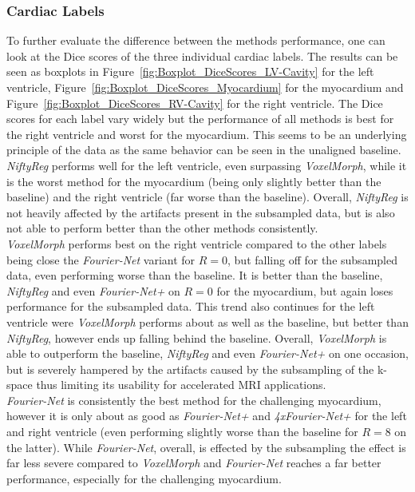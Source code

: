 \documentclass[english,version-2022-01]{uzl-thesis} %
\begin{document}
\subsubsection{Cardiac Labels}
To further evaluate the difference between the methods performance, one can look at the Dice scores of the three individual cardiac labels. The results can be seen as boxplots in Figure~\ref{fig:Boxplot_DiceScores_LV-Cavity} for the left ventricle, Figure~\ref{fig:Boxplot_DiceScores_Myocardium} for the myocardium and Figure~\ref{fig:Boxplot_DiceScores_RV-Cavity} for the right ventricle. The Dice scores for each label vary widely but the performance of all methods is best for the right ventricle and worst for the myocardium. This seems to be an underlying principle of the data as the same behavior can be seen in the unaligned baseline. \\
\emph{NiftyReg} performs well for the left ventricle, even surpassing \emph{VoxelMorph}, while it is the worst method for the myocardium (being only slightly better than the baseline) and the right ventricle (far worse than the baseline). Overall, \emph{NiftyReg} is not heavily affected by the artifacts present in the subsampled data, but is also not able to perform better than the other methods consistently. \\
\emph{VoxelMorph} performs best on the right ventricle compared to the other labels being close the \emph{Fourier-Net} variant for $R=0$, but falling off for the subsampled data, even performing worse than the baseline. It is better than the baseline, \emph{NiftyReg} and even \emph{Fourier-Net+} on $R=0$ for the myocardium, but again loses performance for the subsampled data. This trend also continues for the left ventricle were \emph{VoxelMorph} performs about as well as the baseline, but better than \emph{NiftyReg}, however ends up falling behind the baseline. Overall, \emph{VoxelMorph} is able to outperform the baseline, \emph{NiftyReg} and even \emph{Fourier-Net+} on one occasion, but is severely hampered by the artifacts caused by the subsampling of the k-space thus limiting its usability for accelerated MRI applications.\\
\emph{Fourier-Net} is consistently the best method for the challenging myocardium, however it is only about as good as \emph{Fourier-Net+} and \emph{4xFourier-Net+} for the left and right ventricle (even performing slightly worse than the baseline for $R=8$ on the latter). While \emph{Fourier-Net}, overall, is effected by the subsampling the effect is far less severe compared to \emph{VoxelMorph} and \emph{Fourier-Net} reaches a far better performance, especially for the challenging myocardium.\\
\end{document}
